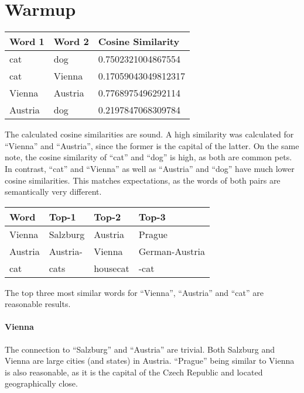 \section{Warmup}

\begin{table}[hb]
\center
\begin{tabular}{|l|l|l|}
\hline
\textbf{Word 1} & \textbf{Word 2} & \textbf{Cosine Similarity} \\ \hline
cat             & dog             & 0.7502321004867554         \\ \hline
cat             & Vienna          & 0.17059043049812317        \\ \hline
Vienna          & Austria         & 0.7768975496292114         \\ \hline
Austria         & dog             & 0.2197847068309784         \\ \hline
\end{tabular}
\end{table}

The calculated cosine similarities are sound.
A high similarity was calculated for \enquote{Vienna} and \enquote{Austria}, since the former is the capital of the latter.
On the same note, the cosine similarity of \enquote{cat} and \enquote{dog} is high, as both are common pets.
In contrast, \enquote{cat} and \enquote{Vienna} as well as \enquote{Austria} and \enquote{dog} have much lower cosine similarities.
This matches expectations, as the words of both pairs are semantically very different.

\begin{table}[hb]
\center
\begin{tabular}{|l|l|l|l|}
\hline
\textbf{Word} & \textbf{Top-1} & \textbf{Top-2} & \textbf{Top-3} \\ \hline
Vienna        & Salzburg       & Austria        & Prague         \\ \hline
Austria       & Austria-       & Vienna         & German-Austria \\ \hline
cat           & cats           & housecat       & -cat           \\ \hline
\end{tabular}
\end{table}

The top three most similar words for \enquote{Vienna}, \enquote{Austria} and \enquote{cat} are reasonable results.

\paragraph{Vienna}
The connection to \enquote{Salzburg} and \enquote{Austria} are trivial. Both Salzburg and Vienna are large cities (and states) in Austria.
\enquote{Prague} being similar to Vienna is also reasonable, as it is the capital of the Czech Republic and located geographically close.


